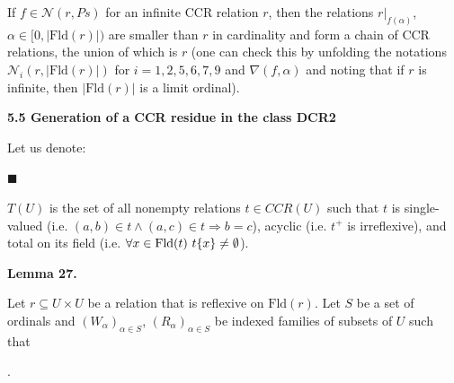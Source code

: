 \documentclass[10pt,a4paper]{amsart}
\begin{document}
 
If $f\in\mathcal{N}(r,Ps)$ for an infinite CCR relation $r$, then the relations $r|_{f(\alpha)}$, $\alpha\in[0,|\mathrm{Fld}(r)|)$ are smaller than $r$ in cardinality and form a chain of CCR relations, the union of which is $r$ (one can check this by unfolding the notations $\mathcal{N}_{i}(r,|\mathrm{Fld}(r)|)$ for $i=1,2,5,6,7,9$ and $\nabla(f,\alpha)$ and noting that if $r$ is infinite, then $|\mathrm{Fld}(r)|$ is a limit ordinal).\par
 
 
 
 
 
 
\par\medskip\noindent\textbf{5.5 Generation of a CCR residue in the class DCR2}\par
 
 
Let us denote:\par
  
\par\noindent  $\blacksquare$ 
 
$T(U)$ is the set of all nonempty relations $t\in CCR(U)$ such that $t$ is single-valued (i.e. $(a,b)\in t\wedge(a,c)\in t\Rightarrow b=c$), acyclic (i.e. $t^{+}$ is irreflexive), and total on its field (i.e. $\forall x\in\mathrm{Fld}(t)\leavevmode\nobreak\ t\{x\}\neq\emptyset$).\par
 
 
  
 
 
\par\medskip\noindent\textbf{Lemma 27.}\par
 
 
Let $r\subseteq U\times U$ be a relation that is reflexive on $\mathrm{Fld}(r)$. Let $S$ be a set of ordinals and $(W_{\alpha})_{\alpha\in S}$, $(R_{\alpha})_{\alpha\in S}$ be indexed families of subsets of $U$ such that\par
  
\par{}. 
 
\end{document}
